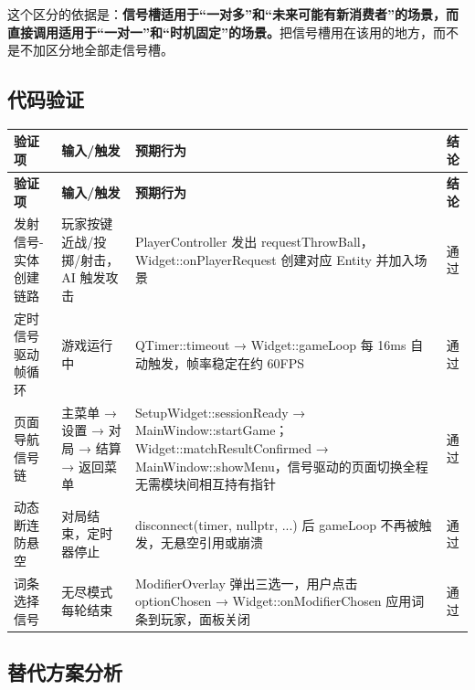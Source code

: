 \documentclass[utf8]{ctexart}
\begin{document}
这个区分的依据是：\textbf{信号槽适用于“一对多”和“未来可能有新消费者”的场景，而直接调用适用于“一对一”和“时机固定”的场景。}把信号槽用在该用的地方，而不是不加区分地全部走信号槽。

\subsection{代码验证}

\begin{longtable}{p{}p{}p{}p{}}
\toprule
\textbf{验证项} & \textbf{输入/触发} & \textbf{预期行为} & \textbf{结论} \\
\midrule
\endfirsthead
\toprule
\textbf{验证项} & \textbf{输入/触发} & \textbf{预期行为} & \textbf{结论} \\
\midrule
\endhead
发射信号-实体创建链路 & 玩家按键近战/投掷/射击，AI 触发攻击 & PlayerController 发出 requestThrowBall，Widget::onPlayerRequest 创建对应 Entity 并加入场景 & 通过 \\
\hline
定时信号驱动帧循环 & 游戏运行中 & QTimer::timeout → Widget::gameLoop 每 16ms 自动触发，帧率稳定在约 60FPS & 通过 \\
\hline
页面导航信号链 & 主菜单 → 设置 → 对局 → 结算 → 返回菜单 & SetupWidget::sessionReady → MainWindow::startGame；Widget::matchResultConfirmed → MainWindow::showMenu，信号驱动的页面切换全程无需模块间相互持有指针 & 通过 \\
\hline
动态断连防悬空 & 对局结束，定时器停止 & disconnect(timer, nullptr, ...) 后 gameLoop 不再被触发，无悬空引用或崩溃 & 通过 \\
\hline
词条选择信号 & 无尽模式每轮结束 & ModifierOverlay 弹出三选一，用户点击 optionChosen → Widget::onModifierChosen 应用词条到玩家，面板关闭 & 通过 \\
\bottomrule
\end{longtable}

\subsection{替代方案分析}
\end{document}
